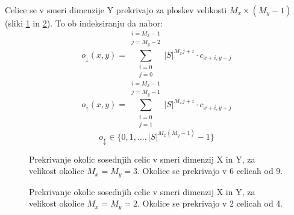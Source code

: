 \documentclass[12pt,a4paper,openany,twoside]{book}
\begin{document}
Celice se v smeri dimenzije Y prekrivajo za ploskev velikosti \(M_x \times (M_y-1)\) (sliki \ref{overlap_dimension_moore} in \ref{overlap_dimension_quad}).
To ob indeksiranju da nabor:
\begin{equation}
o_{\downarrow}(x,y) = \sum_{\substack{i=0 \\ j=0}}^{\substack{i=M_x-1 \\ j=M_y-2}} |S|^{M_x j + i} \cdot c_{x+i,y+j}
\end{equation}
\begin{equation}
o_{\uparrow}(x,y) = \sum_{\substack{i=0 \\ j=1}}^{\substack{i=M_x-1 \\ j=M_y-1}} |S|^{M_x j + i} \cdot c_{x+i,y+j}
\end{equation}
\begin{equation}
o_{\updownarrow} \in \{0, 1, \ldots, |S|^{M_x(M_y-1)}-1\}
\end{equation}

\begin{figure}[htb]
\centerline{}
\caption[Prekrivaje okolic \(3 \times 3\) v smeri dimenzij X in Y.]
{Prekrivanje okolic sosednjih celic v smeri dimenzij X in Y, za velikost okolice \(M_x=M_y=3\).
Okolice se prekrivajo v 6 celicah od 9.}
\label{overlap_dimension_moore}
\end{figure}

\begin{figure}[htb]
\centerline{}
\caption[Prekrivaje okolic \(2 \times 2\) v smeri dimenzij X in Y.]
{Prekrivanje okolic sosednjih celic v smeri dimenzij X in Y, za velikost okolice \(M_x=M_y=2\).
Okolice se prekrivajo v 2 celicah od 4.}
\label{overlap_dimension_quad}
\end{figure}
\end{document}
